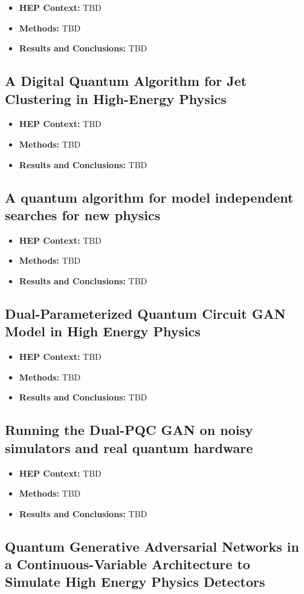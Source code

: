 \begin{itemize}
	\item \textbf{HEP Context: }TBD
	\item \textbf{Methods: }TBD
	\item \textbf{Results and Conclusions: }TBD
\end{itemize}\subsection{A Digital Quantum Algorithm for Jet Clustering in High-Energy Physics~\cite{Pires:2021fka}}
\begin{itemize}
	\item \textbf{HEP Context: }TBD
	\item \textbf{Methods: }TBD
	\item \textbf{Results and Conclusions: }TBD
\end{itemize}\subsection{A quantum algorithm for model independent searches for new physics~\cite{Matchev:2020wwx}}
\begin{itemize}
	\item \textbf{HEP Context: }TBD
	\item \textbf{Methods: }TBD
	\item \textbf{Results and Conclusions: }TBD
\end{itemize}\subsection{Dual-Parameterized Quantum Circuit GAN Model in High Energy Physics~\cite{Chang:2021ufg}}
\begin{itemize}
	\item \textbf{HEP Context: }TBD
	\item \textbf{Methods: }TBD
	\item \textbf{Results and Conclusions: }TBD
\end{itemize}\subsection{Running the Dual-PQC GAN on noisy simulators and real quantum hardware~\cite{Chang:2022dxc}}
\begin{itemize}
	\item \textbf{HEP Context: }TBD
	\item \textbf{Methods: }TBD
	\item \textbf{Results and Conclusions: }TBD
\end{itemize}\subsection{Quantum Generative Adversarial Networks in a Continuous-Variable Architecture to Simulate High Energy Physics Detectors~\cite{Chang:2021jne}}
